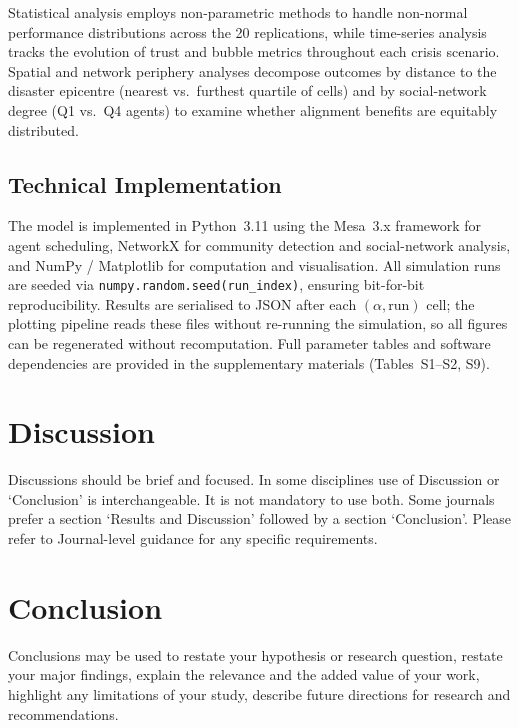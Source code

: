 \documentclass[pdflatex,sn-apa]{sn-jnl}%
\begin{document}
Statistical analysis employs non-parametric methods to handle non-normal
performance distributions across the 20 replications, while time-series analysis
tracks the evolution of trust and bubble metrics throughout each crisis scenario.
Spatial and network periphery analyses decompose outcomes by distance to the
disaster epicentre (nearest vs.\ furthest quartile of cells) and by social-network
degree (Q1 vs.\ Q4 agents) to examine whether alignment benefits are equitably
distributed.

\subsection{Technical Implementation}

The model is implemented in Python~3.11 using the Mesa~3.x framework for agent
scheduling, NetworkX for community detection and social-network analysis, and
NumPy / Matplotlib for computation and visualisation.
All simulation runs are seeded via \texttt{numpy.random.seed(run\_index)},
ensuring bit-for-bit reproducibility.
Results are serialised to JSON after each $(\alpha, \text{run})$ cell; the
plotting pipeline reads these files without re-running the simulation, so all
figures can be regenerated without recomputation.
Full parameter tables and software dependencies are provided in the supplementary
materials (Tables~S1--S2, S9).




\section{Discussion}\label{sec12}

Discussions should be brief and focused. In some disciplines use of Discussion or `Conclusion' is interchangeable. It is not mandatory to use both. Some journals prefer a section `Results and Discussion' followed by a section `Conclusion'. Please refer to Journal-level guidance for any specific requirements. 

\section{Conclusion}\label{sec13}

Conclusions may be used to restate your hypothesis or research question, restate your major findings, explain the relevance and the added value of your work, highlight any limitations of your study, describe future directions for research and recommendations. 
\end{document}
